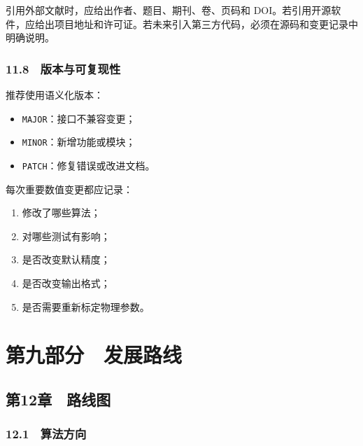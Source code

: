 \documentclass[
]{ctexbook}
\providecommand{\tightlist}{%
  \setlength{\itemsep}{0pt}\setlength{\parskip}{0pt}}
\let\origsection\section
\renewcommand{\section}[1]{%
  \needspace{9\baselineskip}%
  \origsection{#1}%
}
\let\origsubsection\subsection
\renewcommand{\subsection}[1]{%
  \needspace{6\baselineskip}%
  \origsubsection{#1}%
}
\begin{document}
引用外部文献时，应给出作者、题目、期刊、卷、页码和
DOI。若引用开源软件，应给出项目地址和许可证。若未来引入第三方代码，必须在源码和变更记录中明确说明。

\hypertarget{ux7248ux672cux4e0eux53efux590dux73b0ux6027}{%
\subsubsection{11.8　版本与可复现性}\label{ux7248ux672cux4e0eux53efux590dux73b0ux6027}}

推荐使用语义化版本：

\begin{itemize}
\tightlist
\item
  \texttt{MAJOR}：接口不兼容变更；
\item
  \texttt{MINOR}：新增功能或模块；
\item
  \texttt{PATCH}：修复错误或改进文档。
\end{itemize}

每次重要数值变更都应记录：

\begin{enumerate}
\def\labelenumi{\arabic{enumi}.}
\tightlist
\item
  修改了哪些算法；
\item
  对哪些测试有影响；
\item
  是否改变默认精度；
\item
  是否改变输出格式；
\item
  是否需要重新标定物理参数。
\end{enumerate}

\hypertarget{ux7b2cux4e5dux90e8ux5206-ux53d1ux5c55ux8defux7ebf}{%
\section{第九部分　发展路线}\label{ux7b2cux4e5dux90e8ux5206-ux53d1ux5c55ux8defux7ebf}}

\hypertarget{ux7b2c12ux7ae0-ux8defux7ebfux56fe}{%
\subsection{第12章　路线图}\label{ux7b2c12ux7ae0-ux8defux7ebfux56fe}}

\hypertarget{ux7b97ux6cd5ux65b9ux5411}{%
\subsubsection{12.1　算法方向}\label{ux7b97ux6cd5ux65b9ux5411}}
\end{document}
